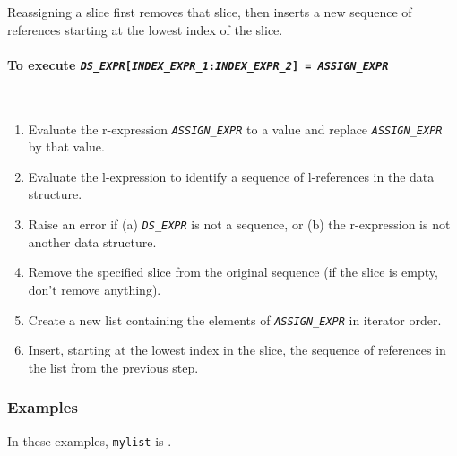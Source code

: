 \documentclass{article}
\newcommand{\expr}[1]{\texttt{#1}}
\newcommand{\mvar}[1]{\expr{\emph{\uppercase{#1}}}}
\newcommand{\myparagraph}[1]{\paragraph{#1} \ifhevea\else \strut \\ \strut \fi}
\begin{document}
  Reassigning a slice first removes that slice, then inserts a new sequence of references starting at the lowest index of the slice.

  \myparagraph{To execute \expr{\mvar{DS\_EXPR}[\mvar{INDEX\_EXPR\_1}:\mvar{INDEX\_EXPR\_2}] = \mvar{ASSIGN\_EXPR}}}
  \begin{enumerate}
    \item
    Evaluate the r-expression \mvar{ASSIGN\_EXPR} to a value and replace
    \mvar{ASSIGN\_EXPR} by that value.

    \item
    Evaluate the l-expression to identify a sequence of l-references in the data structure.

    \item
    Raise an error if (a) \mvar{DS\_EXPR} is not a sequence, or (b) the r-expression is not another data structure.

    \item
    Remove the specified slice from the original sequence (if the slice is empty, don't remove anything).

    \item
    Create a new list containing the elements of \mvar{ASSIGN\_EXPR} in iterator order.

    \item
    Insert, starting at the lowest index in the slice, the sequence of references in the list from the previous step.
  \end{enumerate}

\subsubsection{Examples}

In these examples, \expr{mylist} is \mylist.
\end{document}
